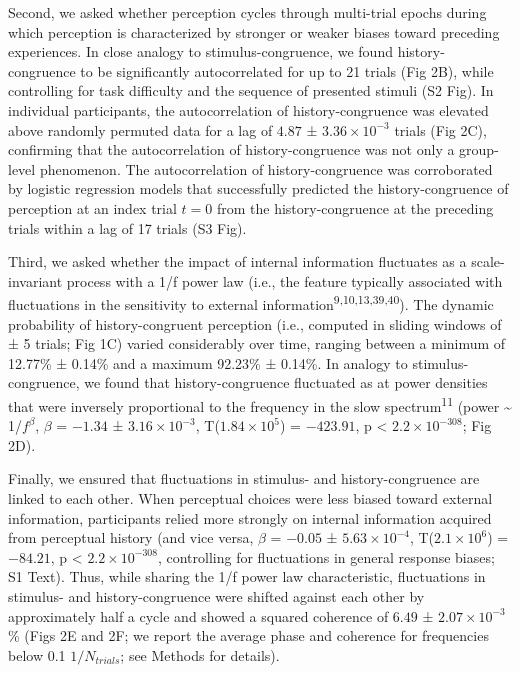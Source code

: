 \documentclass[
]{article}
\begin{document}
Second, we asked whether perception cycles through multi-trial epochs
during which perception is characterized by stronger or weaker biases
toward preceding experiences. In close analogy to stimulus-congruence,
we found history-congruence to be significantly autocorrelated for up to
21 trials (Fig 2B), while controlling for task difficulty and the
sequence of presented stimuli (S2 Fig). In individual
participants, the autocorrelation of history-congruence was elevated
above randomly permuted data for a lag of \(4.87\) ±
\(\ensuremath{3.36\times 10^{-3}}\) trials (Fig 2C), confirming that
the autocorrelation of history-congruence was not only a group-level
phenomenon. The autocorrelation of history-congruence was corroborated
by logistic regression models that successfully predicted the
history-congruence of perception at an index trial \(t = 0\) from the
history-congruence at the preceding trials within a lag of 17 trials
(S3 Fig).

Third, we asked whether the impact of internal information fluctuates as
a scale-invariant process with a 1/f power law (i.e., the feature
typically associated with fluctuations in the sensitivity to external
information\textsuperscript{9,10,13,39,40}). The dynamic probability of
history-congruent perception (i.e., computed in sliding windows of ± 5
trials; Fig 1C) varied considerably over time, ranging between a
minimum of 12.77\% ± 0.14\% and a maximum 92.23\% ± 0.14\%. In analogy
to stimulus-congruence, we found that history-congruence fluctuated as
at power densities that were inversely proportional to the frequency in
the slow spectrum\textsuperscript{11} (power \textasciitilde{}
1/\(f^\beta\), \(\beta\) = \(-1.34\) ±
\(\ensuremath{3.16\times 10^{-3}}\),
T(\(\ensuremath{1.84\times 10^{5}}\)) = \(-423.91\), p < \(\ensuremath{2.2\times 10^{-308}}\); Fig
2D).

Finally, we ensured that fluctuations in stimulus- and
history-congruence are linked to each other. When perceptual choices
were less biased toward external information, participants relied more
strongly on internal information acquired from perceptual history (and
vice versa, \(\beta\) = \(-0.05\) ± \(\ensuremath{5.63\times 10^{-4}}\),
T(\(\ensuremath{2.1\times 10^{6}}\)) = \(-84.21\), p < \(\ensuremath{2.2\times 10^{-308}}\),
controlling for fluctuations in general response biases; S1 Text). Thus, while sharing the 1/f power law characteristic,
fluctuations in stimulus- and history-congruence were shifted against
each other by approximately half a cycle and showed a squared coherence
of \(6.49\) ± \(\ensuremath{2.07\times 10^{-3}}\)\% (Figs 2E and 2F; we
report the average phase and coherence for frequencies below 0.1
\(1/N_{trials}\); see Methods for details).
\end{document}
